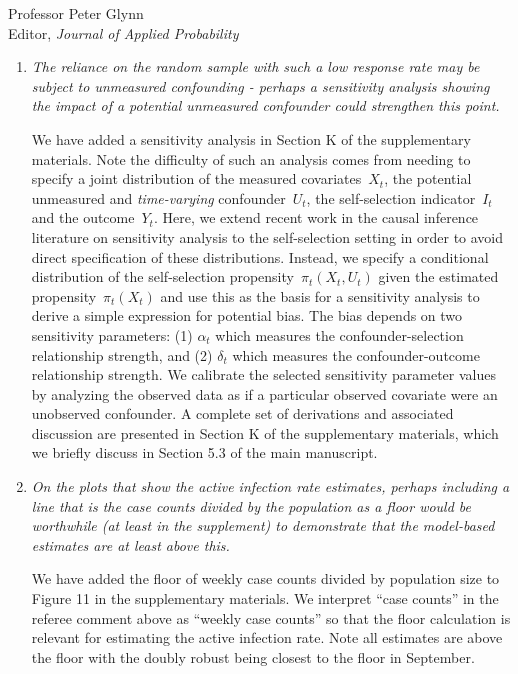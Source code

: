 \documentclass[11pt]{letter} %
\begin{document}
\begin{letter}{Professor
	Peter Glynn\\
	Editor, {\em Journal of Applied Probability}}
\begin{enumerate}
\item {\it The reliance on the random sample with such a low response rate may be subject to unmeasured confounding - perhaps a sensitivity analysis showing the impact of a potential unmeasured confounder could strengthen this point.}

\vspace{5mm}
We have added a sensitivity analysis in Section K of the supplementary materials. Note the difficulty of such an analysis comes from needing to specify a joint distribution of the measured covariates~$X_t$, the potential unmeasured and \emph{time-varying} confounder~$U_t$, the self-selection indicator~$I_t$ and the outcome~$Y_t$.  Here, we extend recent work in the causal inference literature on sensitivity analysis to the self-selection setting in order to avoid direct specification of these distributions.  Instead, we specify a conditional distribution of the self-selection propensity~$\pi_t(X_t, U_t)$ given the estimated propensity~$\pi_t (X_t)$ and use this as the basis for a sensitivity analysis to derive a simple expression for potential bias.  The bias depends on two sensitivity parameters: (1) $\alpha_t$ which measures the confounder-selection relationship strength, and (2) $\delta_t$ which measures the confounder-outcome relationship strength.  We calibrate the selected sensitivity parameter values by analyzing the observed data as if a particular observed covariate were an unobserved confounder.  A complete set of derivations and associated discussion are presented in Section K of the supplementary materials, which we briefly discuss in Section 5.3 of the main manuscript.
\vspace{5mm}

\item {\it On the plots that show the active infection rate estimates, perhaps including a line that is the case counts divided by the population as a floor would be worthwhile (at least in the supplement) to demonstrate that the model-based estimates are at least above this.}

\vspace{5mm}
We have added the floor of weekly case counts divided by population size to Figure 11 in the supplementary materials.  We interpret ``case counts'' in the referee comment above as ``weekly case counts'' so that the floor calculation is relevant for estimating the active infection rate.  Note all estimates are above the floor with the doubly robust being closest to the floor in September.
\vspace{5mm}


\end{enumerate}
\end{letter}
\end{document}
